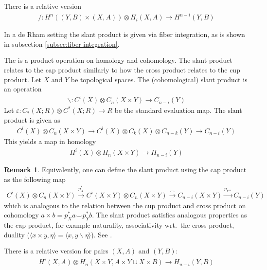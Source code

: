 \documentclass{scrartcl}
\let\emph\relax
\theoremstyle{plain}
\theoremstyle{definition}
\newtheorem{remark}[theorem]{Remark}
\newcommand{\union}{\mathbin{\cup}}
\newcommand{\capp}{\mathbin{\frown}}
\newcommand{\cupp}{\mathbin{\smile}}
\newcommand{\slant}{\mathbin{/}}
\let\xto\xrightarrow
\begin{document}
There is a relative version 
\begin{align*}
    \slant\colon H^n((Y,B)\times (X, A))\otimes H_i(X, A) \to H^{n-i}(Y, B)
\end{align*}

In a de Rham setting the slant product is given via fiber integration, as is shown in subsection \ref{subsec:fiber-integration}.

The \emph{slant product on homology} is a product operation on homology and cohomology. The slant product relates to the cap product similarly to how the cross product relates to the cup product. Let $X$ and $Y$ be topological spaces. The (cohomological) slant product is an operation 
\begin{align*}
    \backslash \colon C^i(X) \otimes C_n(X\times Y) \to C_{n-i}(Y)
\end{align*}
Let $\varepsilon \colon C_*(X; R) \otimes C^*(X; R) \to R$ be the standard evaluation map. The slant product is given as 
\begin{align*}
    C^i(X) \otimes C_n(X\times Y) \to C^i(X) \otimes C_k(X)\otimes C_{n-k}(Y) \to C_{n-i}(Y)
\end{align*}
This yields a map in homology
\begin{align*}
    H^i(X)\otimes H_n(X\times Y) \to H_{n-i}(Y)
\end{align*}

\begin{remark}
Equivalently, one can define the slant product using the cap product as the following map
\begin{align*}
    C^i(X)\otimes C_n(X\times Y) \xto{p_X^*} C^i(X\times Y) \otimes C_n(X\times Y) \xto{\capp} C_{n-i}(X\times Y) \xto{p_{Y*}} C_{n-i}(Y)
\end{align*}
which is analogous to the relation between the cup product and cross product on cohomology $a\times b = p_X^*a \cupp p_Y^* b$. The slant product satisfies analogous properties as the cap product, for example naturality, associativity wrt.\ the cross product, duality ($\langle x\times y, \eta\rangle = \langle x, y\backslash\eta \rangle$). See \cite[VII.11]{dold2012lectures}.
\end{remark}

There is a relative version for pairs $(X, A)$ and $(Y, B)$:
\begin{align*}
    H^i(X, A)\otimes H_n(X\times Y, A\times Y\union X\times B) \to H_{n-i}(Y, B)
\end{align*}
\end{document}
